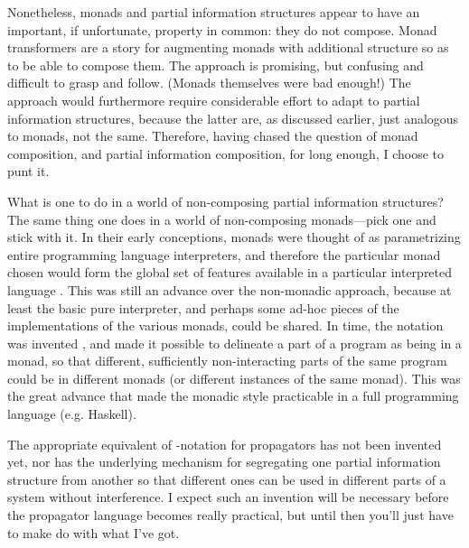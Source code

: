 \documentclass[12pt,letterpaper]{article}
\begin{document}
Nonetheless, monads and partial information structures appear to have
an important, if unfortunate, property in common: they do not compose.
Monad transformers \cite{?} are a story for augmenting monads with
additional structure so as to be able to compose them.  The approach
is promising, but confusing and difficult to grasp and follow.
(Monads themselves were bad enough!)  The approach would furthermore
require considerable effort to adapt to partial information
structures, because the latter are, as discussed earlier, just
analogous to monads, not the same.  Therefore, having chased the
question of monad composition, and partial information composition,
for long enough, I choose to punt it.

What is one to do in a world of non-composing partial information
structures?  The same thing one does in a world of non-composing
monads---pick one and stick with it.  In their early
conceptions,\cite{wadler?, moggi?}  monads were thought of as parametrizing
entire programming language interpreters, and therefore the particular
monad chosen would form the global set of features available in a
particular interpreted language .  This was still an advance over the non-monadic approach,
because at least the basic pure interpreter, and perhaps some ad-hoc
pieces of the implementations of the various monads, could be shared.
In time, the  notation was invented \cite{??}, and made it
possible to delineate a part of a program as being in a monad, so that
different, sufficiently non-interacting parts of the same program
could be in different monads (or different instances of the same
monad).  This was the great advance that made the monadic style
practicable in a full programming language (e.g. Haskell).

The appropriate equivalent of -notation for propagators has
not been invented yet, nor has the underlying mechanism for
segregating one partial information structure from another so that
different ones can be used in different parts of a system without
interference.  I expect such an invention will be necessary before the
propagator language becomes really practical, but until then you'll
just have to make do with what I've got.
\end{document}
